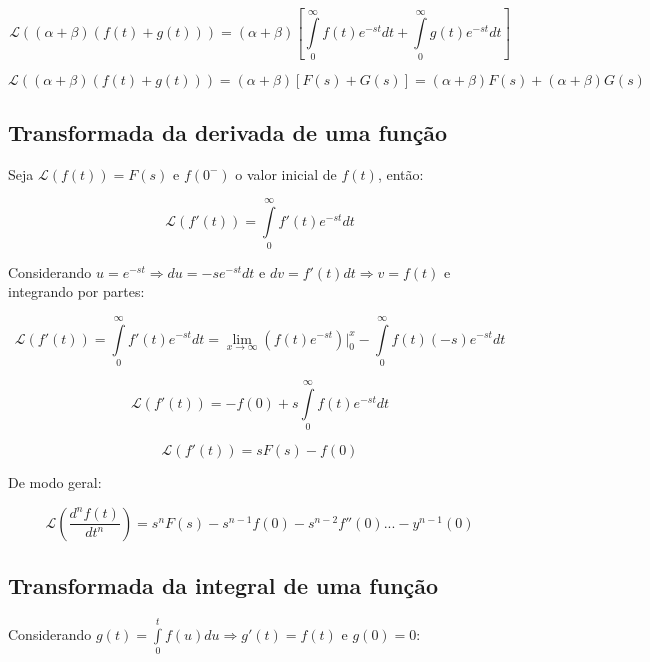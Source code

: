 \documentclass[12pt,fleqn]{book} %
\begin{document}
\begin{equation}
\mathscr{L}((\alpha+\beta)(f(t)+g(t))) = (\alpha+\beta)[\int\limits_{0}^{\infty}f(t)e^{-st}dt +\int\limits_{0}^{\infty}g(t)e^{-st}dt ]
\end{equation}

\begin{equation}
\mathscr{L}((\alpha+\beta)(f(t)+g(t))) = (\alpha+\beta)[F(s)+G(s)] = (\alpha+\beta)F(s) + (\alpha+\beta)G(s)
\end{equation}

\subsection{Transformada da derivada de uma função}

Seja $\mathscr{L}(f(t)) = F(s)$ e $f(0^-)$ o valor inicial de $f(t)$, então:

\begin{equation}
\mathscr{L}(f'(t)) = \int\limits_{0}^{\infty}f'(t)e^{-st}dt
\end{equation} 

Considerando $u = e^{-st}\Rightarrow du = -se^{-st}dt$ e $dv = f'(t)dt \Rightarrow v = f(t)$ e integrando por partes:

\begin{equation}
\mathscr{L}(f'(t)) = \int\limits_{0}^{\infty}f'(t)e^{-st}dt = \lim_{x\rightarrow\infty}(f(t)e^{-st})\Biggr|_0^x -\int\limits_{0}^{\infty}f(t)(-s)e^{-st}dt
\end{equation}

\begin{equation}
\mathscr{L}(f'(t)) = -f(0) + s\int\limits_{0}^{\infty}f(t)e^{-st}dt
\end{equation}

\begin{equation}
\mathscr{L}(f'(t)) = sF(s)-f(0)
\end{equation}

De modo geral:

\begin{equation}
\mathscr{L}(\frac{d^nf(t)}{dt^n}) = s^nF(s) - s^{n-1}f(0) -s^{n-2}f''(0)...-y^{n-1}(0)
\end{equation}

\subsection{Transformada da integral de uma função}

Considerando $g(t) = \int\limits_{0}^{t}f(u)du \Rightarrow g'(t) = f(t)$ e $g(0) = 0$:
\end{document}

